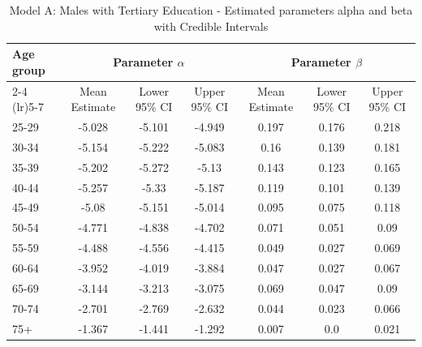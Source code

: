 \begin{landscape}
\begin{table}[htbp]
\centering
\caption{Model A: Males with Tertiary Education - Estimated parameters alpha and beta  with Credible Intervals}
\label{tab:parameters_ab8}
\begin{tabular}{@{}lcccccc@{}}
\toprule
Age group & \multicolumn{3}{c}{Parameter \(\alpha\)} & \multicolumn{3}{c}{Parameter \(\beta\)} \\ 
\cmidrule(lr){2-4} \cmidrule(lr){5-7}
          & Mean Estimate & Lower 95\% CI & Upper 95\% CI & Mean Estimate & Lower 95\% CI & Upper 95\% CI \\ 
\midrule
25-29 & -5.028 & -5.101 & -4.949 & 0.197 & 0.176 & 0.218 \\
30-34 & -5.154 & -5.222 & -5.083 & 0.16 & 0.139 & 0.181 \\
35-39 & -5.202 & -5.272 & -5.13 & 0.143 & 0.123 & 0.165 \\
40-44 & -5.257 & -5.33 & -5.187 & 0.119 & 0.101 & 0.139 \\
45-49 & -5.08 & -5.151 & -5.014 & 0.095 & 0.075 & 0.118 \\
50-54 & -4.771 & -4.838 & -4.702 & 0.071 & 0.051 & 0.09 \\
55-59 & -4.488 & -4.556 & -4.415 & 0.049 & 0.027 & 0.069 \\
60-64 & -3.952 & -4.019 & -3.884 & 0.047 & 0.027 & 0.067 \\
65-69 & -3.144 & -3.213 & -3.075 & 0.069 & 0.047 & 0.09 \\
70-74 & -2.701 & -2.769 & -2.632 & 0.044 & 0.023 & 0.066 \\
75+ & -1.367 & -1.441 & -1.292 & 0.007 & 0.0 & 0.021 \\
\bottomrule
\end{tabular}
\end{table}
\end{landscape}